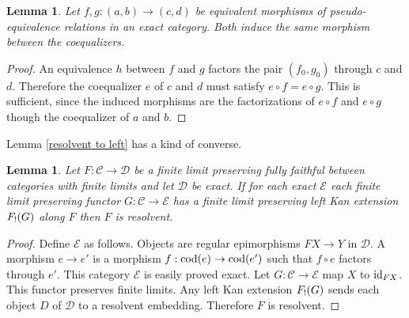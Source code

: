 \documentclass[sort&compress]{elsarticle}
\theoremstyle{plain}
\newtheorem{lemma}[theorem]{Lemma}
\theoremstyle{definition}
\theoremstyle{remark}
\newcommand\hide[1]{}
\newcommand\cat\mathcal
\newcommand\of:
\begin{document}
\begin{lemma} Let $f,g\of(a,b)\to(c,d)$ be equivalent morphisms of pseudo-e\-qui\-va\-len\-ce relations in an exact category. Both induce the same morphism between the coequalizers. \label{equivalence implies equality} \end{lemma}

\begin{proof} An equivalence $h$ between $f$ and $g$ factors the pair $(f_0,g_0)$ through $c$ and $d$. Therefore the coequalizer $e$ of $c$ and $d$ must satisfy $e\circ f=e\circ g$. This is sufficient, since the induced morphisms are the factorizations of $e \circ f$ and $e\circ g$ though the coequalizer of $a$ and $b$.
\end{proof}

Lemma \ref{resolvent to left} has a kind of converse.

\begin{lemma} Let $F\of\cat C\to\cat D$ be a finite limit preserving fully faithful between categories with finite limits and let $\cat D$ be exact. If for each exact $\cat E$ each finite limit preserving functor $G\of\cat C\to\cat E$ has a finite limit preserving left Kan extension $F_!(G)$ along $F$ then $F$ is resolvent. \label{left to resolvent}\end{lemma}

\begin{proof} Define $\cat E$ as follows. Objects are regular epimorphisms $FX\to Y$ in $\cat D$. A morphism $e\to e'$ is a morphism $f\of\cod(e)\to\cod(e')$
such that $f\circ e$ factors through $e'$. This category $\cat E$ is easily proved exact. Let $G\of \cat C\to\cat E$ map $X$ to $\mathrm{id}_{FX}$. This functor preserves finite limits. Any left Kan extension $F_!(G)$ sends each object $D$ of $\cat D$ to a resolvent embedding. Therefore $F$ is resolvent.
\end{proof}

\hide{ The intuition is equational and essentially algebraic logic. Finite limit preserving functors preserve these.}
\end{document}
